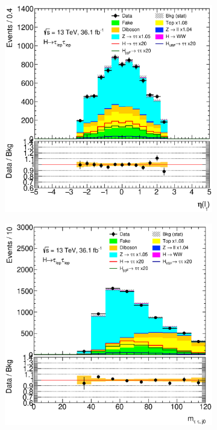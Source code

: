 \begin{figure}[htb]
\begin{subfigure}[t]{0.3\textwidth}
    \end{subfigure}
    \begin{subfigure}[t]{0.3\textwidth}
        \includegraphics[width=\textwidth]{./plots/mva/modeling/input_vars/BOOST_DF/ll-CutMVABoostedCatDF-LeptonEta0-lin.eps}
    \end{subfigure}
    \begin{subfigure}[t]{0.3\textwidth}
        \includegraphics[width=\textwidth]{./plots/mva/modeling/input_vars/BOOST_DF/ll-CutMVABoostedCatDF-MassTauTauJ0-lin.eps}

\end{subfigure}
\end{figure}
